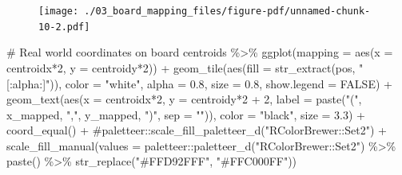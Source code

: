 \documentclass[
  letterpaper,
  DIV=11,
  numbers=noendperiod]{scrreprt}
\newenvironment{Shaded}{\begin{snugshade}}{\end{snugshade}}
\newcommand{\AttributeTok}[1]{\textcolor[rgb]{0.40,0.45,0.13}{#1}}
\newcommand{\CommentTok}[1]{\textcolor[rgb]{0.37,0.37,0.37}{#1}}
\newcommand{\ConstantTok}[1]{\textcolor[rgb]{0.56,0.35,0.01}{#1}}
\newcommand{\DecValTok}[1]{\textcolor[rgb]{0.68,0.00,0.00}{#1}}
\newcommand{\FloatTok}[1]{\textcolor[rgb]{0.68,0.00,0.00}{#1}}
\newcommand{\FunctionTok}[1]{\textcolor[rgb]{0.28,0.35,0.67}{#1}}
\newcommand{\NormalTok}[1]{\textcolor[rgb]{0.00,0.23,0.31}{#1}}
\newcommand{\SpecialCharTok}[1]{\textcolor[rgb]{0.37,0.37,0.37}{#1}}
\newcommand{\StringTok}[1]{\textcolor[rgb]{0.13,0.47,0.30}{#1}}
\begin{document}
\begin{figure}[H]

{\centering \texttt{[image: ./03\_board\_mapping\_files/figure-pdf/unnamed-chunk-10-2.pdf]}

}

\end{figure}

\begin{Shaded}
\begin{Highlighting}[]
\CommentTok{\# Real world coordinates on board}
\NormalTok{centroids }\SpecialCharTok{\%\textgreater{}\%} 
  \FunctionTok{ggplot}\NormalTok{(}\AttributeTok{mapping =} \FunctionTok{aes}\NormalTok{(}\AttributeTok{x =}\NormalTok{ centroidx}\SpecialCharTok{*}\DecValTok{2}\NormalTok{, }\AttributeTok{y =}\NormalTok{ centroidy}\SpecialCharTok{*}\DecValTok{2}\NormalTok{)) }\SpecialCharTok{+}
  \FunctionTok{geom\_tile}\NormalTok{(}\FunctionTok{aes}\NormalTok{(}\AttributeTok{fill =} \FunctionTok{str\_extract}\NormalTok{(pos, }\StringTok{"[:alpha:]"}\NormalTok{)), }\AttributeTok{color =} \StringTok{"white"}\NormalTok{, }\AttributeTok{alpha =} \FloatTok{0.8}\NormalTok{, }\AttributeTok{size =} \FloatTok{0.8}\NormalTok{, }\AttributeTok{show.legend =} \ConstantTok{FALSE}\NormalTok{) }\SpecialCharTok{+}
  \FunctionTok{geom\_text}\NormalTok{(}\FunctionTok{aes}\NormalTok{(}\AttributeTok{x =}\NormalTok{ centroidx}\SpecialCharTok{*}\DecValTok{2}\NormalTok{, }\AttributeTok{y =}\NormalTok{ centroidy}\SpecialCharTok{*}\DecValTok{2} \SpecialCharTok{+} \DecValTok{2}\NormalTok{, }\AttributeTok{label =} \FunctionTok{paste}\NormalTok{(}\StringTok{"("}\NormalTok{, x\_mapped, }\StringTok{","}\NormalTok{, y\_mapped, }\StringTok{")"}\NormalTok{, }\AttributeTok{sep =} \StringTok{""}\NormalTok{)), }\AttributeTok{color =} \StringTok{"black"}\NormalTok{, }\AttributeTok{size =} \FloatTok{3.3}\NormalTok{) }\SpecialCharTok{+}
  \FunctionTok{coord\_equal}\NormalTok{() }\SpecialCharTok{+}
  \CommentTok{\#paletteer::scale\_fill\_paletteer\_d("RColorBrewer::Set2") +}
  \FunctionTok{scale\_fill\_manual}\NormalTok{(}\AttributeTok{values =}\NormalTok{ paletteer}\SpecialCharTok{::}\FunctionTok{paletteer\_d}\NormalTok{(}\StringTok{"RColorBrewer::Set2"}\NormalTok{) }\SpecialCharTok{\%\textgreater{}\%} \FunctionTok{paste}\NormalTok{() }\SpecialCharTok{\%\textgreater{}\%} \FunctionTok{str\_replace}\NormalTok{(}\StringTok{"\#FFD92FFF"}\NormalTok{, }\StringTok{"\#FFC000FF"}\NormalTok{))}
\end{Highlighting}
\end{Shaded}
\end{document}
